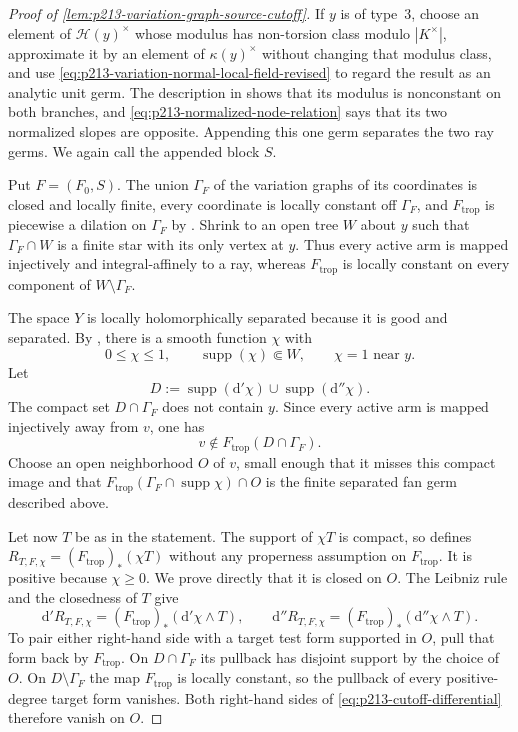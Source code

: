 \begin{proof}[Proof of
\cref{lem:p213-variation-graph-source-cutoff}]
If $y$ is of type~$3$, choose an element of $\mathcal H(y)^\times$ whose
modulus has non-torsion class modulo $|K^\times|$, approximate it by an
element of $\kappa(y)^\times$ without changing that modulus class, and use
\eqref{eq:p213-variation-normal-local-field-revised} to regard the result
as an analytic unit germ.  The description in
\cite[\S4.2.11.2]{Ducros24CurveStructure} shows that its modulus is
nonconstant on both branches, and
\eqref{eq:p213-normalized-node-relation} says that its two normalized
slopes are opposite.  Appending this one germ separates the two ray
germs.  We again call the appended block $S$.

Put $F=(F_0,S)$.  The union $\Gamma_F$ of the variation graphs of its
coordinates is closed and locally finite, every coordinate is locally
constant off $\Gamma_F$, and $F_{\mathrm{trop}}$ is piecewise a dilation
on $\Gamma_F$ by \cite[\S\S4.5.21.1--4.5.21.2]
{Ducros24CurveStructure}.  Shrink to an open tree $W$ about $y$ such that
$\Gamma_F\cap W$ is a finite star with its only vertex at $y$.  Thus every
active arm is mapped injectively and integral-affinely to a ray, whereas
$F_{\mathrm{trop}}$ is locally constant on every component of
$W\setminus\Gamma_F$.

The space $Y$ is locally holomorphically separated because it is good and
separated.  By \cite[Corollary~15.2.5]{CLD25}, there is a smooth function
$\chi$ with
\[
 0\leq\chi\leq1,\qquad \operatorname{supp}(\chi)\Subset W,
 \qquad \chi=1\text{ near }y.
\]
Let
\[
        D:=\operatorname{supp}(\mathrm d'\chi)
             \cup\operatorname{supp}(\mathrm d''\chi).
\]
The compact set $D\cap\Gamma_F$ does not contain $y$.  Since every active
arm is mapped injectively away from $v$, one has
\[
                v\notin F_{\mathrm{trop}}(D\cap\Gamma_F).
\]
Choose an open neighborhood $O$ of $v$, small enough that it misses this
compact image and that
$F_{\mathrm{trop}}(\Gamma_F\cap\operatorname{supp}\chi)\cap O$ is the
finite separated fan germ described above.

Let now $T$ be as in the statement.  The support of $\chi T$ is compact,
so \cite[\S7.1.11]{CLD25} defines
$R_{T,F,\chi}=(F_{\mathrm{trop}})_*(\chi T)$ without any properness
assumption on $F_{\mathrm{trop}}$.  It is positive because $\chi\geq0$.
We prove directly that it is closed on $O$.  The Leibniz rule and the
closedness of $T$ give
\begin{equation}
 \mathrm d'R_{T,F,\chi}
     =(F_{\mathrm{trop}})_*(\mathrm d'\chi\wedge T),
 \qquad
 \mathrm d''R_{T,F,\chi}
     =(F_{\mathrm{trop}})_*(\mathrm d''\chi\wedge T).
\label{eq:p213-cutoff-differential}
\end{equation}
To pair either right-hand side with a target test form supported in $O$,
pull that form back by $F_{\mathrm{trop}}$.  On
$D\cap\Gamma_F$ its pullback has disjoint support by the choice of $O$.
On $D\setminus\Gamma_F$ the map $F_{\mathrm{trop}}$ is locally constant,
so the pullback of every positive-degree target form vanishes.  Both
right-hand sides of \eqref{eq:p213-cutoff-differential} therefore vanish
on $O$.


\end{proof}
